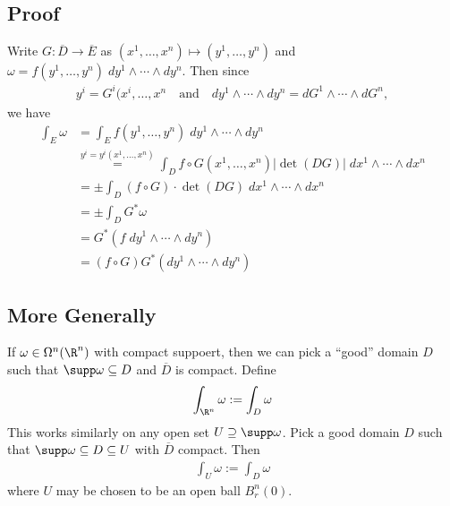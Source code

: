 \documentclass[11pt]{article}
\begin{document}
\subsection*{Proof}
\label{sec:org651f65d}
Write \(G:\overline{D}\to\overline{E}\) as \((x^{1},\ldots,x^{n})\mapsto(y^{1},\ldots,y^{n})\) and \(\omega=f(y^{1},\ldots,y^{n})\;dy^{1}\wedge\cdots\wedge dy^{n}\). Then since\\
\begin{align*}
  y^{i}=G^{i}(x^{i},\ldots,x^{n}
  \quad\text{and}\quad
  dy^{1}\wedge\cdots\wedge dy^{n}
  =dG^{1}\wedge\cdots\wedge dG^{n},
\end{align*}
we have\\
\begin{align*}
  \int_{E}\omega
  &=\int_{E}f(y^{1},\ldots,y^{n})\;dy^{1}\wedge\cdots\wedge dy^{n} \\
  &\overset{y^{i}=y^{i}(x^{1},\ldots,x^{n})}{=}\int_{D}f\circ G(x^{1},\ldots,x^{n})|\det(DG)|\;dx^{1}\wedge\cdots\wedge dx^{n} \\
  &=\pm\int_{D}(f\circ G)\cdot\det(DG)\;dx^{1}\wedge\cdots\wedge dx^{n} \\
  &=\pm\int_{D}G^{*}\omega \\
  &=G^{*}(f\;dy^{1}\wedge\cdots\wedge dy^{n}) \\
  &=(f\circ G)G^{*}(dy^{1}\wedge\cdots\wedge dy^{n})
\end{align*}
\subsection*{More Generally}
\label{sec:org52482c3}
If \(\omega\in\Omega^{n}(\R^{n})\) with compact suppoert, then we can pick a ``good'' domain \(D\) such that \(\supp\omega\subseteq D\) and \(\overline{D}\) is compact. Define\\
\begin{align*}
  \int_{\R^{n}}\omega:=\int_{D}\omega
\end{align*}
This works similarly on any open set \(U\supseteq\supp\omega\). Pick a good domain \(D\) such that \(\supp\omega\subseteq D\subseteq U\) with \(\overline{D}\) compact. Then\\
\begin{align*}
  \int_{U}\omega:=\int_{D}\omega
\end{align*}
where \(U\) may be chosen to be an open ball \(B_{r}^{n}(0)\).\\
\end{document}
